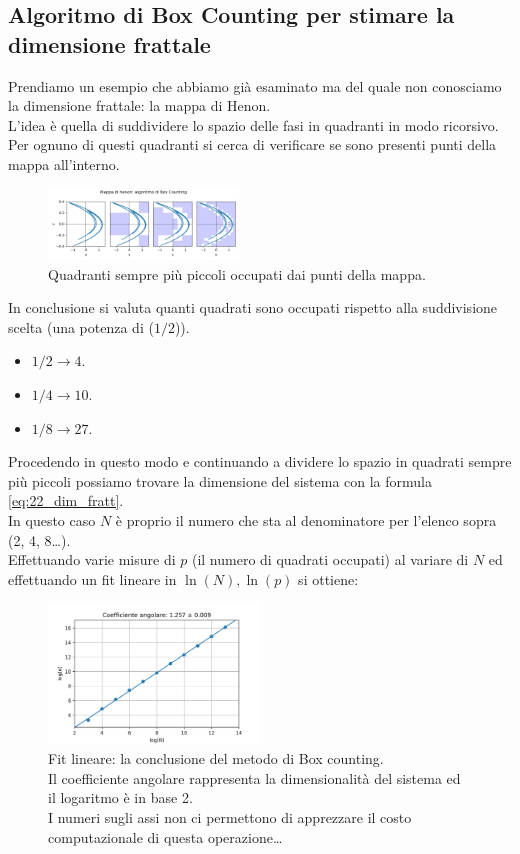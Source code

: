 \subsection{Algoritmo di Box Counting per stimare la dimensione frattale}%
\label{sub:Algoritmo di Box Counting per stimare la dimensione frattale}
Prendiamo un esempio che abbiamo già esaminato ma del quale non conosciamo la dimensione frattale: la mappa di Henon. \\
L'idea è quella di suddividere lo spazio delle fasi in quadranti in modo ricorsivo. Per ognuno di questi quadranti si cerca di verificare se sono presenti punti della mappa all'interno.
\begin{figure}[H]
    \centering
    \includegraphics[width=0.45\textwidth]{figures/22_henonmap_box.png}
    \caption{\scriptsize Quadranti sempre più piccoli occupati dai punti della mappa.}
    \label{fig:figures-22_henonmap_box-png}
\end{figure}
\noindent
In conclusione si valuta quanti quadrati sono occupati rispetto alla suddivisione scelta (una potenza di ($1 /2$)).
\begin{itemize}
    \item $1 /2 \to 4$.
    \item $1 /4 \to 10$.
    \item $1 /8 \to 27$.
\end{itemize}
Procedendo in questo modo e continuando a dividere lo spazio in quadrati sempre più piccoli possiamo trovare la dimensione del sistema con la formula \ref{eq:22_dim_fratt}.\\
In questo caso $N$ è proprio il numero che sta al denominatore per l'elenco sopra (2, 4, 8\ldots).\\
Effettuando varie misure di $p$ (il numero di quadrati occupati) al variare di $N$ ed effettuando un fit lineare in $\ln (N), \ln (p)$ si ottiene:
\begin{figure}[H]
    \centering
    \includegraphics[width=0.5\textwidth]{figures/22_box_fit.png}
    \caption{\scriptsize Fit lineare: la conclusione del metodo di Box counting. \\
    Il coefficiente angolare rappresenta la dimensionalità del sistema ed il logaritmo è in base 2.\\
    I numeri sugli assi non ci permettono di apprezzare il costo computazionale di questa operazione\ldots}
    \label{fig:figures-22_box_fit-png}
\end{figure}
